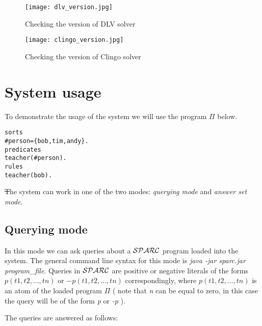 \documentclass[12pt, letterpaper]{article}
\begin{document}
\begin{figure}[p]
\centering
\texttt{[image: dlv\_version.jpg]}
\caption{Checking the version of DLV solver}
\label{fig:dlv_solver_check}
\end{figure}


\begin{figure}[p]
\centering
\texttt{[image: clingo\_version.jpg]}
\caption{Checking the version of Clingo solver}
\label{fig:clingo_solver_check}
\end{figure}

\section{System usage}

To demonstrate the usage of the system we will use the program $\Pi$ below.
\begin{verbatim}
sorts
#person={bob,tim,andy}.
predicates
teacher(#person).
rules
teacher(bob).
\end{verbatim}

\st
The system can work in one of the  two modes: \textit{querying mode} and \textit{answer set mode}.

\subsection{Querying mode}

In this mode we can ask queries about a ${\cal SPARC}$ program loaded into the system.
The general command line syntax for this mode is \textit{java -jar sparc.jar program\_file}.
Queries in ${\cal SPARC}$ are positive or negative literals of the forms $p(t1,t2,\dots,tn)$ or
$-p(t1,t2,\dots,tn)$ correspondingly, where $p(t1,t2,\dots,tn)$  is an atom of the loaded program $\Pi$ 
( note that \textit{n} can be equal to zero, in this case the query will be of the form \textit{p} or \textit{-p}  ).

The queries are answered as follows:
\end{document}
